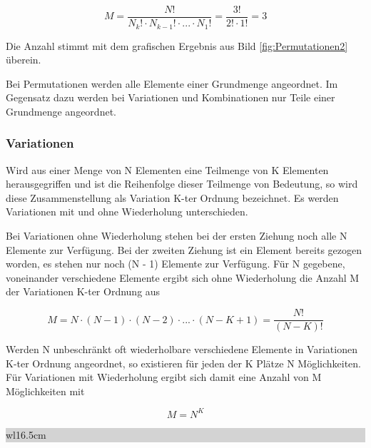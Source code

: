 \begin{equation}\label{eq:twotwentysix}
M=\dfrac{N!}{N_{\displaystyle k} !\cdot N_{\displaystyle k-1} !\cdot ...\cdot N_{\displaystyle 1} !} =\dfrac{3!}{2!\cdot 1!} =3
\end{equation}

\noindent Die Anzahl stimmt mit dem grafischen Ergebnis aus Bild \ref{fig:Permutationen2} \"{u}berein. \newline

\noindent Bei Permutationen werden alle Elemente einer Grundmenge angeordnet. Im Gegensatz dazu werden bei Variationen und Kombinationen nur Teile einer Grundmenge angeordnet.

\clearpage

\subsubsection{Variationen}
\noindent Wird aus einer Menge von N Elementen eine Teilmenge von K Elementen herausgegriffen und ist die Reihenfolge dieser Teilmenge von Bedeutung, so wird diese Zusammenstellung als Variation K-ter Ordnung bezeichnet. Es werden Variationen mit und ohne Wiederholung unterschieden.\newline

\noindent Bei Variationen ohne Wiederholung stehen bei der ersten Ziehung noch alle N Elemente zur Verf\"{u}gung. Bei der zweiten Ziehung ist ein Element bereits gezogen worden, es stehen nur noch (N - 1) Elemente zur Verf\"{u}gung. F\"{u}r N gegebene, voneinander verschiedene Elemente ergibt sich ohne Wiederholung die Anzahl M der Variationen K-ter Ordnung aus 

\begin{equation}\label{eq:twotwentyseven}
M=N\cdot (N-1)\cdot (N-2)\cdot ...\cdot (N-K+1)=\dfrac{N!}{(N-K)!}
\end{equation}

\noindent Werden N unbeschr\"{a}nkt oft wiederholbare verschiedene Elemente in Variationen K-ter Ordnung angeordnet, so existieren f\"{u}r jeden der K Pl\"{a}tze N M\"{o}glichkeiten. F\"{u}r Variationen mit Wiederholung ergibt sich damit eine Anzahl von M M\"{o}glichkeiten mit

\begin{equation}\label{eq:twotwentyeight}
M=N^{K}
\end{equation}

\noindent
\colorbox{lightgray}{%
%
\renewcommand\arraystretch{0.6}%
\begin{tabular}{ wl{16.5cm} }
{\selectfont
{}}
\end{tabular}%
}\bigskip

